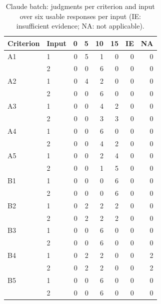 \begin{table}[t]
\caption{Claude batch: judgments per criterion and input over six usable responses per input (IE: insufficient evidence; NA: not applicable).}
\label{tab:ratings-claude}
\centering\small\begin{tabular}{llrrrrrr}\toprule
Criterion & Input & 0 & 5 & 10 & 15 & IE & NA \\
\midrule
A1 & 1 & 0 & 5 & 1 & 0 & 0 & 0 \\
 & 2 & 0 & 0 & 6 & 0 & 0 & 0 \\
A2 & 1 & 0 & 4 & 2 & 0 & 0 & 0 \\
 & 2 & 0 & 0 & 6 & 0 & 0 & 0 \\
A3 & 1 & 0 & 0 & 4 & 2 & 0 & 0 \\
 & 2 & 0 & 0 & 3 & 3 & 0 & 0 \\
A4 & 1 & 0 & 0 & 6 & 0 & 0 & 0 \\
 & 2 & 0 & 0 & 4 & 2 & 0 & 0 \\
A5 & 1 & 0 & 0 & 2 & 4 & 0 & 0 \\
 & 2 & 0 & 0 & 1 & 5 & 0 & 0 \\
B1 & 1 & 0 & 0 & 0 & 6 & 0 & 0 \\
 & 2 & 0 & 0 & 0 & 6 & 0 & 0 \\
B2 & 1 & 0 & 2 & 2 & 2 & 0 & 0 \\
 & 2 & 0 & 2 & 2 & 2 & 0 & 0 \\
B3 & 1 & 0 & 0 & 6 & 0 & 0 & 0 \\
 & 2 & 0 & 0 & 6 & 0 & 0 & 0 \\
B4 & 1 & 0 & 2 & 2 & 0 & 0 & 2 \\
 & 2 & 0 & 2 & 2 & 0 & 0 & 2 \\
B5 & 1 & 0 & 0 & 6 & 0 & 0 & 0 \\
 & 2 & 0 & 0 & 6 & 0 & 0 & 0 \\
\bottomrule\end{tabular}
\end{table}

